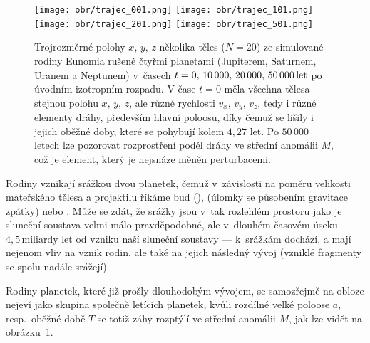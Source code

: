 \documentclass[A4paper, 12pt, oneside]{book}
\begin{document}
\begin{figure}
	\centering
	\texttt{[image: obr/trajec\_001.png]}
	\texttt{[image: obr/trajec\_101.png]} \\
	\texttt{[image: obr/trajec\_201.png]}
	\texttt{[image: obr/trajec\_501.png]}
	\caption{Trojrozměrné polohy $x,\,y,\,z$ několika těles ($N=20$) ze simulované rodiny Eunomia rušené čtyřmi planetami (Jupiterem, Saturnem, Uranem a Neptunem) v~časech $t=0,\,10\,000,\,20\,000,\,50\,000\,{\rm let}$ po úvodním izotropním rozpadu. V čase $t=0$ měla všechna tělesa stejnou polohu $x,\,y,\,z$, ale různé rychlosti $v_x,\,v_y,\,v_z$, tedy i různé elementy dráhy, především hlavní poloosu, díky čemuž se lišily i jejich oběžné doby, které se pohybují kolem $4,27$ let. Po $50\,000$ letech lze pozorovat rozprostření podél dráhy ve střední anomálii $M$, což je element, který je nejsnáze měněn perturbacemi.} \label{fig:trajec}
\end{figure}

Rodiny vznikají srážkou dvou planetek, čemuž v~závislosti na poměru velikosti mateřského tělesa a projektilu říkáme buď  (),  (úlomky se působením gravitace  zpátky) nebo . Může se zdát, že srážky jsou v~tak rozlehlém prostoru jako je sluneční soustava velmi málo pravděpodobné, ale v~dlouhém časovém úseku --- $4,5\,\text{miliardy let}$ od vzniku naší sluneční soustavy --- k~srážkám dochází, a mají nejenom vliv na vznik rodin, ale také na jejich následný vývoj (vzniklé fragmenty se spolu nadále srážejí).

Rodiny planetek, které již prošly dlouhodobým vývojem, se samozřejmě na obloze nejeví jako skupina společně letících planetek, kvůli rozdílné velké poloose $a$, resp.\ oběžné době $T$ se totiž záhy rozptýlí ve střední anomálii $M$, jak lze vidět na obrázku~\ref{fig:trajec}.
\end{document}
